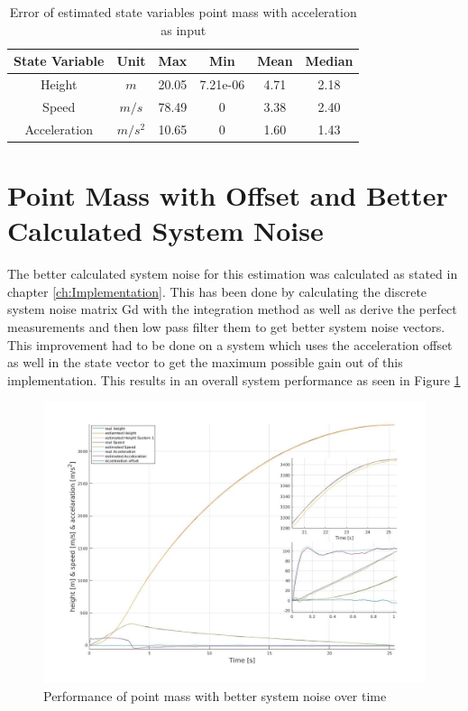 \begin{table}[h!]
\centering
\begin{tabular}{cccccc}
\hline
\multicolumn{1}{|c|}{State Variable} & \multicolumn{1}{c|}{Unit} & \multicolumn{1}{c|}{Max} & \multicolumn{1}{c|}{Min} & \multicolumn{1}{c|}{Mean} & \multicolumn{1}{c|}{Median} \\ \hline
Height                            & $m$                         & 20.05                  & 7.21e-06                 & 4.71                    & 2.18                      \\
Speed                             & $m/s$                       & 78.49                  & 0                        & 3.38                    & 2.40                      \\
Acceleration                       & $m/s^2$   			& 10.65                  & 0                        & 1.60                    & 1.43
\end{tabular}
\caption{Error of estimated state variables point mass with acceleration as input}
\label{tab:ErrorPointMassAccelerationInput}
\end{table}

\newpage
\section{Point Mass with Offset and Better Calculated System Noise}
The better calculated system noise for this estimation was calculated as stated in chapter \ref{ch:Implementation}.
This has been done by calculating the discrete system noise matrix Gd with the integration method as well as
derive the perfect measurements and then low pass filter them to get better system noise vectors.
This improvement had to be done on a system which uses the acceleration offset as well in the state vector to get the maximum possible gain out of this implementation.
This results in an overall system performance as seen in Figure \ref{fig:PointMassBetterNoisePerformance}

\begin{figure}[h!]
 \centering
 \includegraphics[width=.8 \textwidth]{./Pictures/PointMassBetterNoisePerformance.jpg}
 \caption{Performance of point mass with better system noise over time}
 \label{fig:PointMassBetterNoisePerformance}
\end{figure}

